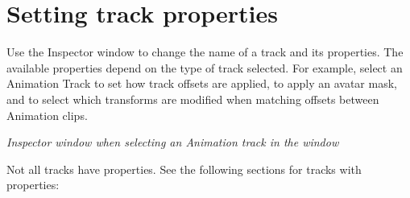 \chapter{Setting track properties}
\hypertarget{md__hey_tea_9_2_library_2_package_cache_2com_8unity_8timeline_0d1_87_85_2_documentation_0i_2insp__trk}{}\label{md__hey_tea_9_2_library_2_package_cache_2com_8unity_8timeline_0d1_87_85_2_documentation_0i_2insp__trk}
\label{md__hey_tea_9_2_library_2_package_cache_2com_8unity_8timeline_0d1_87_85_2_documentation_0i_2insp__trk_autotoc_md4682}%
%
 Use the Inspector window to change the name of a track and its properties. The available properties depend on the type of track selected. For example, select an Animation Track to set how track offsets are applied, to apply an avatar mask, and to select which transforms are modified when matching offsets between Animation clips.



{\itshape Inspector window when selecting an Animation track in the  window}

Not all tracks have properties. See the following sections for tracks with properties\+:


\begin{DoxyItemize}
\item {}
\item {} 
\end{DoxyItemize}